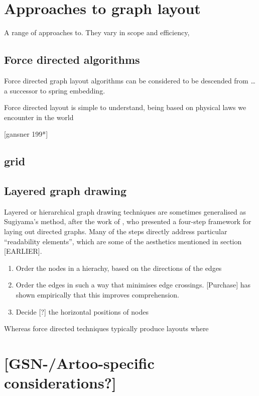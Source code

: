 \section{Approaches to graph layout}

A range of approaches to. They vary in scope and efficiency, 

\subsection{Force directed algorithms}

 Force directed graph layout algorithms can be considered to be descended from   \citet{tutte} \ldots a successor to \citet{tutte} spring embedding.

Force directed layout is simple to understand, being based on physical laws we encounter in the world 


[gansner 199*]

\subsection{grid}




\subsection{Layered graph drawing}

Layered or hierarchical graph drawing techniques are sometimes generalised as Sugiyama's method, after the work of \citet{4308636}, who presented a four-step framework for laying out directed graphs. Many of the steps directly address particular ``readability elements'', which are some of the aesthetics mentioned in section [EARLIER].

\begin{enumerate}
\item Order the nodes in a hierachy, based on the directions of the edges
\item Order the edges in such a way that minimises edge crossings. [Purchase] has shown empirically that this improves comprehension.
\item Decide [?] the horizontal positions of nodes
\end{enumerate}

Whereas force directed techniques typically produce layouts where 




\section{[GSN-/Artoo-specific considerations?]}

